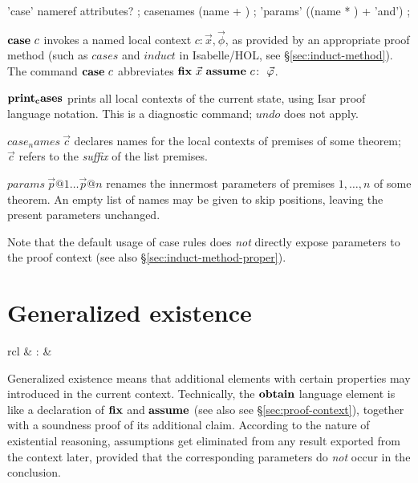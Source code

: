 \begin{rail}
  'case' nameref attributes?
  ;
  casenames (name + )
  ;
  'params' ((name * ) + 'and')
  ;
\end{rail}

\begin{descr}
\item [${\mathord{\mathbf{case}}}~c$] invokes a named local context $c\colon \vec x, \vec \phi$,
  as provided by an appropriate proof method (such as $cases$ and $induct$ in
  Isabelle/HOL, see \S\ref{sec:induct-method}).  The command ${\mathord{\mathbf{case}}}~c$
  abbreviates $\FIX{\vec x}~\ASSUME{c}{\vec\phi}$.
\item [${\mathord{\mathbf{print_cases}}}$] prints all local contexts of the current
  state, using Isar proof language notation.  This is a diagnostic command;
  $undo$ does not apply.
\item [$case_names~\vec c$] declares names for the local contexts of premises
  of some theorem; $\vec c$ refers to the \emph{suffix} of the list premises.
\item [$params~\vec p@1 \dots \vec p@n$] renames the innermost parameters of
  premises $1, \dots, n$ of some theorem.  An empty list of names may be given
  to skip positions, leaving the present parameters unchanged.

  Note that the default usage of case rules does \emph{not} directly expose
  parameters to the proof context (see also \S\ref{sec:induct-method-proper}).
\end{descr}


\section{Generalized existence}\label{sec:obtain}

\begin{matharray}{rcl}
   & : &  \\
\end{matharray}

Generalized existence means that additional elements with certain properties
may introduced in the current context.  Technically, the ${\mathord{\mathbf{obtain}}}$
language element is like a declaration of ${\mathord{\mathbf{fix}}}$ and ${\mathord{\mathbf{assume}}}$ (see
also see \S\ref{sec:proof-context}), together with a soundness proof of its
additional claim.  According to the nature of existential reasoning,
assumptions get eliminated from any result exported from the context later,
provided that the corresponding parameters do \emph{not} occur in the
conclusion.

